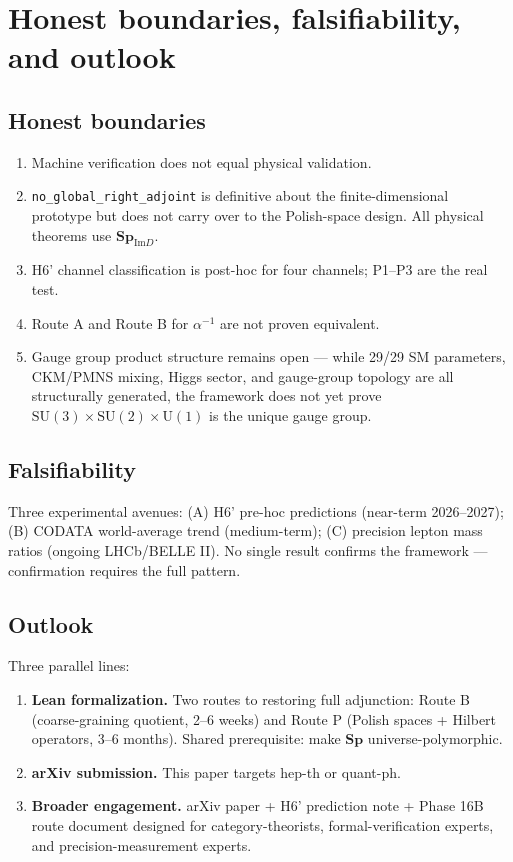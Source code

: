 \documentclass[11pt,twoside]{article}
\newcommand{\spc}{\mathbf{Sp}}
\newcommand{\spimd}{\mathbf{Sp}_{\mathrm{Im}D}}
\begin{document}
\section{Honest boundaries, falsifiability, and outlook}
\label{sec:boundaries}

\subsection{Honest boundaries}
\begin{enumerate}
\item Machine verification does not equal physical validation.
\item \texttt{no\_global\_right\_adjoint} is definitive about the finite-dimensional prototype but does not carry over to the Polish-space design. All physical theorems use $\spimd$.
\item H6' channel classification is post-hoc for four channels; P1--P3 are the real test.
\item Route A and Route B for $\alpha^{-1}$ are not proven equivalent.
\item Gauge group product structure remains open — while 29/29 SM parameters, CKM/PMNS mixing, Higgs sector, and gauge-group topology are all structurally generated, the framework does not yet prove $\mathrm{SU}(3)\times\mathrm{SU}(2)\times\mathrm{U}(1)$ is the unique gauge group.
\end{enumerate}

\subsection{Falsifiability}
Three experimental avenues: (A) H6' pre-hoc predictions (near-term 2026--2027); (B) CODATA world-average trend (medium-term); (C) precision lepton mass ratios (ongoing LHCb/BELLE II). No single result confirms the framework — confirmation requires the full pattern.

\subsection{Outlook}
Three parallel lines:
\begin{enumerate}
\item \textbf{Lean formalization.} Two routes to restoring full adjunction: Route B (coarse-graining quotient, 2--6 weeks) and Route P (Polish spaces + Hilbert operators, 3--6 months). Shared prerequisite: make $\spc$ universe-polymorphic.
\item \textbf{arXiv submission.} This paper targets hep-th or quant-ph.
\item \textbf{Broader engagement.} arXiv paper + H6' prediction note + Phase 16B route document designed for category-theorists, formal-verification experts, and precision-measurement experts.
\end{enumerate}
\end{document}
